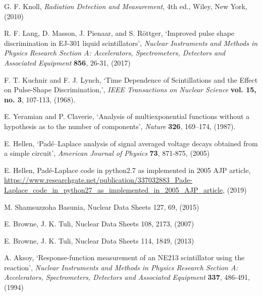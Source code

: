 \documentclass[11pt]{article}
\numberwithin{equation}{section}
\numberwithin{figure}{section}
\numberwithin{table}{section}
\begin{document}
\begin{thebibliography}{9}
    G. F. Knoll, \textit{Radiation Detection and Measurement}, 4th ed., Wiley, New York, (2010)

    R. F. Lang, D. Masson, J. Pienaar, and S. R\"ottger, `Improved pulse shape discrimination in EJ-301 liquid scintillators', \textit{Nuclear Instruments and Methods in Physics Research Section A: Accelerators, Spectrometers, Detectors and Associated Equipment} \textbf{856}, 26-31, (2017)

    F. T. Kuchnir and F. J. Lynch, `Time Dependence of Scintillations and the Effect on Pulse-Shape Discrimination,', \textit{IEEE Transactions on Nuclear Science} \textbf{vol. 15, no. 3}, 107-113, (1968).

    E. Yeramian and P. Claverie, `Analysis of multiexponential functions without a hypothesis as to the number of components', \textit{Nature} \textbf{326}, 169–174, (1987).

    E. Hellen, `Pad\'e–Laplace analysis of signal averaged voltage decays obtained from a simple circuit', \textit{American Journal of Physics} \textbf{73}, 871-875, (2005)
    
    E. Hellen, Pad\'e-Laplace code in python2.7 as implemented in 2005 AJP article, \url{https://www.researchgate.net/publication/337032883_Pade-Laplace_code_in_python27_as_implemented_in_2005_AJP_article}, (2019)

    M. Shamsuzzoha Basunia, Nuclear Data Sheets 127, 69, (2015)
    
    E. Browne, J. K. Tuli, Nuclear Data Sheets 108, 2173, (2007)
    
    E. Browne, J. K. Tuli, Nuclear Data Sheets 114, 1849, (2013)

    A. Aksoy, `Response-function measurement of an NE213 scintillator using the  reaction', \textit{Nuclear Instruments and Methods in Physics Research Section A: Accelerators, Spectrometers, Detectors and Associated Equipment} \textbf{337}, 486-491, (1994)


\end{thebibliography}
\end{document}
